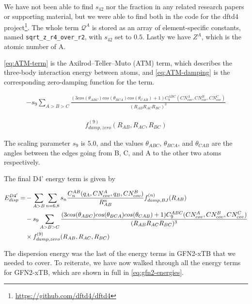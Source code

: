 We have not been able to find $s_{42}$ nor the fraction in any related research papers or supporting material, but we were able to find both in the code for the dftd4 project\footnote{\url{https://github.com/dftd4/dftd4}}. The whole term $\mathcal{Q}^A$ is stored as an array of element-specific constants, named \verb|sqrt_z_r4_over_r2|, with $s_{42}$ set to $0.5$. Lastly we have $Z^A$, which is the atomic number of A.

\autoref{eq:ATM-term} is the Axilrod–Teller–Muto (ATM) term, which describes the three-body interaction energy between atoms, and \autoref{eq:ATM-damping} is the corresponding zero-damping function for the term.

\begin{equation}
\begin{split}
        -s_9 \sum_{A>B>C} \frac{(3cos(\theta_{ABC})cos(\theta_{BCA})cos(\theta_{CAB})+1)C_9^{ABC}(CN_{cov}^A,CN_{cov}^B,CN_{cov}^C)}{(R_{AB} R_{AC} R_{BC})^3} \label{eq:ATM-term}
\end{split}
\end{equation}

\begin{equation}
\begin{split}
        f^{(9)}_{damp,zero}(R_{AB},R_{AC},R_{BC}) \label{eq:ATM-damping}
\end{split}
\end{equation}


The scaling parameter $s_9$ is $5.0$, and the values \(\theta_{ABC}\), \(\theta_{BCA}\), and \(\theta_{CAB}\) are the angles between the edges going from B, C, and A to the other two atoms respectively.






The final D4' energy term is given by


\begin{equation}
\begin{split}
  \E{disp}^{D4'} = &-\sum_{A>B} \sum_{n=6,8} s_n \frac{C_n^{AB} (q_A, CN^A_{cov}, q_B, CN^B_{cov})}{R^n_{AB}} f^{(n)}_{damp,BJ} (R_{AB}) \\
  &-s_9 \sum_{A>B>C} \frac{(3cos(\theta_{ABC})cos(\theta_{BCA})cos(\theta_{CAB})+1)C_9^{ABC}(CN_{cov}^A,CN_{cov}^B,CN_{cov}^C)}{(R_{AB} R_{AC} R_{BC})^3} \\
  &\times f^{(9)}_{damp,zero}(R_{AB},R_{AC},R_{BC})
\end{split}
\end{equation}


The dispersion energy was the last of the energy terms in GFN2-xTB that we needed to cover. To reiterate, we have now walked through all the energy terms for GFN2-xTB, which are shown in full in \autoref{eq:gfn2-energies}.
